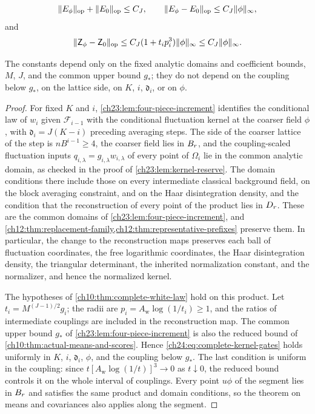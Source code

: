 \begin{lemma}
\begin{enumerate}
\begin{equation}
 \lVert E_\phi\rVert_{\mathrm{op}}+\lVert E_0\rVert_{\mathrm{op}}\le C_J,\qquad \lVert E_\phi-E_0\rVert_{\mathrm{op}}\le C_J\lVert \phi\rVert_\infty,
\end{equation}
and
\begin{equation}\label{ch24:eq:uniform-reconstructed-covariance}
 \lVert \mathsf Z_\phi-\mathsf Z_0\rVert_{\mathrm{op}}\le C_J(1+t_ip_i^3)\lVert \phi\rVert_\infty\le C_J\lVert \phi\rVert_\infty.
\end{equation}
\end{enumerate}
The constants depend only on the fixed analytic domains and coefficient bounds, $M$, $J$, and the common upper bound $g_*$; they do not depend on the coupling below $g_*$, on the lattice side, on $K$, $i$, $\mathfrak d_i$, or on $\phi$.
\end{lemma}

\begin{proof}
For fixed $K$ and $i$, \cref{ch23:lem:four-piece-increment} identifies the conditional law of $w_i$ given $\mathcal F_{i-1}$ with the conditional fluctuation kernel at the coarser field $\phi$, with $\mathfrak d_i=J(K-i)$ preceding averaging steps. The side of the coarser lattice of the step is $nB^{i-1}\ge4$, the coarser field lies in $B_{r}$, and the coupling-scaled fluctuation inputs $q_{i,\lambda}=g_{i,\lambda}w_{i,\lambda}$ of every point of $\Omega_i$ lie in the common analytic domain, as checked in the proof of \cref{ch23:lem:kernel-reserve}. The domain conditions there include those on every intermediate classical background field, on the block averaging constraint, and on the Haar disintegration density, and the condition that the reconstruction of every point of the product lies in $D_{r}$. These are the common domains of \cref{ch23:lem:four-piece-increment}, and \cref{ch12:thm:replacement-family,ch12:thm:representative-prefixes} preserve them. In particular, the change to the reconstruction maps preserves each ball of fluctuation coordinates, the free logarithmic coordinates, the Haar disintegration density, the triangular determinant, the inherited normalization constant, and the normalizer, and hence the normalized kernel.

The hypotheses of \cref{ch10:thm:complete-white-law} hold on this product. Let $t_i=M^{(J-1)/2}g_i$; the radii are $p_i=A_{\mathrm w}\log(1/t_i)\ge1$, and the ratios of intermediate couplings are included in the reconstruction map. The common upper bound $g_*$ of \cref{ch23:lem:four-piece-increment} is also the reduced bound of \cref{ch10:thm:actual-means-and-scores}. Hence \eqref{ch24:eq:complete-kernel-gates} holds uniformly in $K$, $i$, $\mathfrak d_i$, $\phi$, and the coupling below $g_*$. The last condition is uniform in the coupling: since $t[A_{\mathrm w}\log(1/t)]^3\to0$ as $t\downarrow0$, the reduced bound controls it on the whole interval of couplings. Every point $u\phi$ of the segment lies in $B_{r}$ and satisfies the same product and domain conditions, so the theorem on means and covariances also applies along the segment.


\end{proof}
